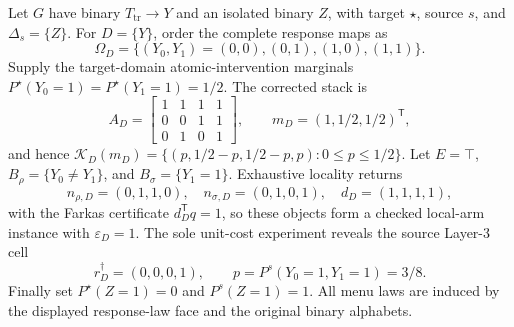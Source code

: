 Let \(G\) have binary \(T_{\mathrm{tr}}\to Y\) and an isolated binary \(Z\), with target \(\star\), source \(s\), and \(\Delta_s=\{Z\}\).  For \(D=\{Y\}\), order the complete response maps as
\[
\Omega_D=\{(Y_0,Y_1)=(0,0),(0,1),(1,0),(1,1)\}.
\]
Supply the target-domain atomic-intervention marginals \(P^\star(Y_0=1)=P^\star(Y_1=1)=1/2\).  The corrected stack is
\[
A_D=\begin{bmatrix}1&1&1&1\\0&0&1&1\\0&1&0&1\end{bmatrix},\qquad
m_D=(1,1/2,1/2)^{\mathsf T},
\]
and hence \(\mathcal K_D(m_D)=\{(p,1/2-p,1/2-p,p):0\le p\le1/2\}\).  Let \(E=\top\), \(B_\rho=\{Y_0\ne Y_1\}\), and \(B_\sigma=\{Y_1=1\}\).  Exhaustive locality returns
\[
n_{\rho,D}=(0,1,1,0),\quad n_{\sigma,D}=(0,1,0,1),\quad
d_D=(1,1,1,1),
\]
with the Farkas certificate \(d_D^{\mathsf T}q=1\), so these objects form a checked local-arm instance with \(\varepsilon_D=1\).  The sole unit-cost experiment reveals the source Layer-3 cell
\[
r_D^\dagger=(0,0,0,1),\qquad
p=P^s(Y_0=1,Y_1=1)=3/8.
\]
Finally set \(P^\star(Z=1)=0\) and \(P^s(Z=1)=1\).  All menu laws are induced by the displayed response-law face and the original binary alphabets.